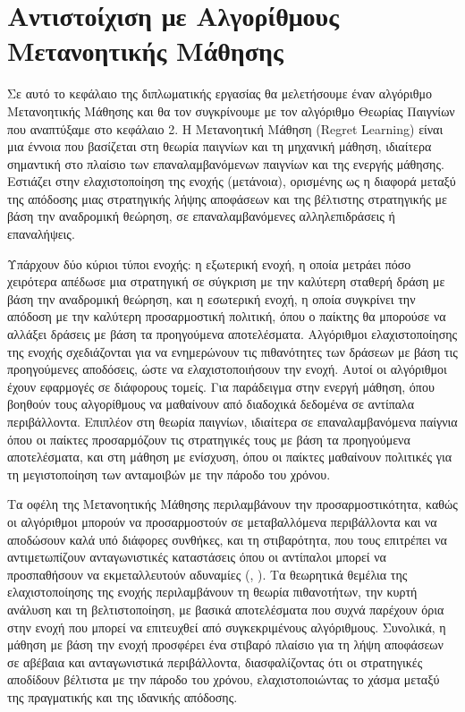 \chapter{Αντιστοίχιση με Αλγορίθμους Μετανοητικής Μάθησης}

Σε αυτό το κεφάλαιο της διπλωματικής εργασίας θα μελετήσουμε έναν αλγόριθμο Μετανοητικής Μάθησης και θα τον συγκρίνουμε με τον αλγόριθμο Θεωρίας Παιγνίων που αναπτύξαμε στο κεφάλαιο 2. Η Μετανοητική Μάθηση (Regret Learning) είναι μια έννοια που βασίζεται στη θεωρία παιγνίων και τη μηχανική μάθηση, ιδιαίτερα σημαντική στο πλαίσιο των επαναλαμβανόμενων παιγνίων και της ενεργής μάθησης. Εστιάζει στην ελαχιστοποίηση της ενοχής (μετάνοια), ορισμένης ως η διαφορά μεταξύ της απόδοσης μιας στρατηγικής λήψης αποφάσεων και της βέλτιστης στρατηγικής με βάση την αναδρομική θεώρηση, σε επαναλαμβανόμενες αλληλεπιδράσεις ή επαναλήψεις. 

Υπάρχουν δύο κύριοι τύποι ενοχής: η εξωτερική ενοχή, η οποία μετράει πόσο χειρότερα απέδωσε μια στρατηγική σε σύγκριση με την καλύτερη σταθερή δράση με βάση την αναδρομική θεώρηση, και η εσωτερική ενοχή, η οποία συγκρίνει την απόδοση με την καλύτερη προσαρμοστική πολιτική, όπου ο παίκτης θα μπορούσε να αλλάξει δράσεις με βάση τα προηγούμενα αποτελέσματα. Αλγόριθμοι ελαχιστοποίησης της ενοχής σχεδιάζονται για να ενημερώνουν τις πιθανότητες των δράσεων με βάση τις προηγούμενες αποδόσεις, ώστε να ελαχιστοποιήσουν την ενοχή. Αυτοί οι αλγόριθμοι έχουν εφαρμογές σε διάφορους τομείς. Για παράδειγμα στην ενεργή μάθηση, όπου βοηθούν τους αλγορίθμους να μαθαίνουν από διαδοχικά δεδομένα σε αντίπαλα περιβάλλοντα. Επιπλέον στη θεωρία παιγνίων, ιδιαίτερα σε επαναλαμβανόμενα παίγνια όπου οι παίκτες προσαρμόζουν τις στρατηγικές τους με βάση τα προηγούμενα αποτελέσματα, και στη μάθηση με ενίσχυση, όπου οι παίκτες μαθαίνουν πολιτικές για τη μεγιστοποίηση των ανταμοιβών με την πάροδο του χρόνου. 

Τα οφέλη της Μετανοητικής Μάθησης περιλαμβάνουν την προσαρμοστικότητα, καθώς οι αλγόριθμοι μπορούν να προσαρμοστούν σε μεταβαλλόμενα περιβάλλοντα και να αποδώσουν καλά υπό διάφορες συνθήκες, και τη στιβαρότητα, που τους επιτρέπει να αντιμετωπίζουν ανταγωνιστικές καταστάσεις όπου οι αντίπαλοι μπορεί να προσπαθήσουν να εκμεταλλευτούν αδυναμίες (, ). Τα θεωρητικά θεμέλια της ελαχιστοποίησης της ενοχής περιλαμβάνουν τη θεωρία πιθανοτήτων, την κυρτή ανάλυση και τη βελτιστοποίηση, με βασικά αποτελέσματα που συχνά παρέχουν όρια στην ενοχή που μπορεί να επιτευχθεί από συγκεκριμένους αλγόριθμους. Συνολικά, η μάθηση με βάση την ενοχή προσφέρει ένα στιβαρό πλαίσιο για τη λήψη αποφάσεων σε αβέβαια και ανταγωνιστικά περιβάλλοντα, διασφαλίζοντας ότι οι στρατηγικές αποδίδουν βέλτιστα με την πάροδο του χρόνου, ελαχιστοποιώντας το χάσμα μεταξύ της πραγματικής και της ιδανικής απόδοσης.

